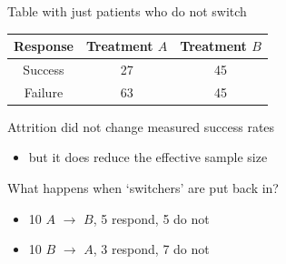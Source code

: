 \documentclass[ignorenonframetext,]{beamer}
\providecommand{\tightlist}{%
\setlength{\itemsep}{0pt}\setlength{\parskip}{0pt}}
\begin{document}
\begin{frame}{Table with just patients who do not switch}

\begin{longtable}[]{@{}ccc@{}}
\toprule
\begin{minipage}[b]{0.15\columnwidth}\centering\strut
Response\strut
\end{minipage} & \begin{minipage}[b]{0.22\columnwidth}\centering\strut
Treatment \(A\)\strut
\end{minipage} & \begin{minipage}[b]{0.25\columnwidth}\centering\strut
Treatment \(B\)\strut
\end{minipage}\tabularnewline
\midrule
\endhead
\begin{minipage}[t]{0.15\columnwidth}\centering\strut
Success\strut
\end{minipage} & \begin{minipage}[t]{0.22\columnwidth}\centering\strut
27\strut
\end{minipage} & \begin{minipage}[t]{0.25\columnwidth}\centering\strut
45\strut
\end{minipage}\tabularnewline
\begin{minipage}[t]{0.15\columnwidth}\centering\strut
Failure\strut
\end{minipage} & \begin{minipage}[t]{0.22\columnwidth}\centering\strut
63\strut
\end{minipage} & \begin{minipage}[t]{0.25\columnwidth}\centering\strut
45\strut
\end{minipage}\tabularnewline
\bottomrule
\end{longtable}

Attrition did not change measured success rates

\begin{itemize}
\tightlist
\item
  but it does reduce the effective sample size
\end{itemize}

What happens when `switchers' are put back in?

\begin{itemize}
\item
  10 \(A\) \(\rightarrow\) \(B\), 5 respond, 5 do not
\item
  10 \(B\) \(\rightarrow\) \(A\), 3 respond, 7 do not
\end{itemize}

\end{frame}
\end{document}
